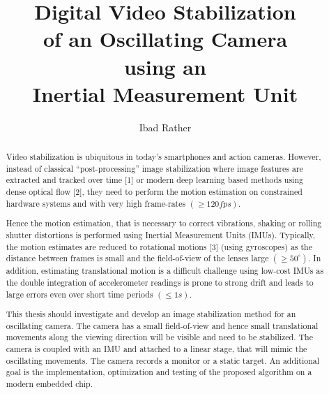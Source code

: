 \documentclass[
thesis%
]{csthes}
\title{Digital Video Stabilization \\ of an Oscillating Camera \\
using an \\ Inertial Measurement Unit}
\subtitle{}%
\author{Ibad Rather \matr{1532894}}
\begin{document}
\maketitle
\begin{abstract}
Video stabilization is ubiquitous in today's smartphones and action cameras. However, instead of classical “post-processing” image stabilization where image features are extracted and tracked over time [1] or modern deep learning based methods using dense optical flow [2], they need to perform the motion estimation on constrained hardware systems and with very high  frame-rates $(\geq 120 fps).$ 

Hence the motion estimation, that is necessary to correct vibrations, shaking or rolling shutter distortions is performed using Inertial Measurement Units (IMUs). Typically, the motion estimates are reduced to rotational motions [3] (using gyroscopes) as the distance between frames is small and the field-of-view of the lenses large $(\geq 50^\circ)$. In addition, estimating translational motion is a difficult challenge using low-cost IMUs as the double integration of accelerometer readings is prone to strong drift and leads to large errors even over short time periods $(\leq 1s)$. 

This thesis should investigate and develop an image stabilization method for an oscillating camera. The camera has a small field-of-view and hence small translational movements along the viewing direction will be visible and need to be stabilized. The camera is coupled with an IMU and attached to a linear stage, that will mimic the oscillating movements. The camera records a monitor or a static target. An additional goal is the implementation, optimization and testing of the proposed algorithm on a modern embedded chip.

\end{abstract}
\tableofcontents%

\listoftables%
\listoffigures%

\mainmatter









\end{document}
